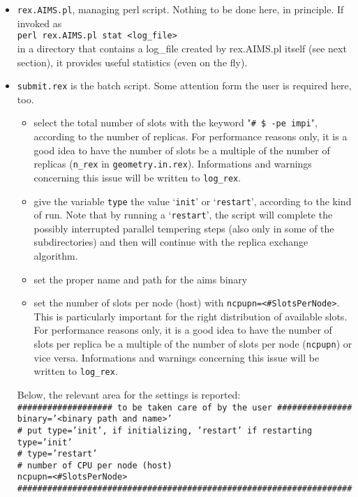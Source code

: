 \begin{itemize}
\item \texttt{rex.AIMS.pl}, managing perl script. Nothing to be done here, in principle. If invoked as \\
\texttt{perl rex.AIMS.pl stat <log\_file>}\\
in a directory that contains a log\_file created by rex.AIMS.pl itself (see next section), it provides useful statistics (even on the fly).


\item \texttt{submit.rex} is the batch script. Some attention form the user is required here, too.
\begin{itemize}
	\item select the total number of slots with the keyword "\texttt{\# \$ -pe impi}", according to the number of replicas. For performance reasons only, it is a good idea to have the number of slots be a multiple of the number of replicas (\texttt{n\_rex} in \texttt{geometry.in.rex}). Informations and warnings concerning this issue will be written to \texttt{log\_rex}.

\item give the variable \texttt{type} the value `\texttt{init}' or `\texttt{restart}', according to the kind of run. Note that by running a `\texttt{restart}', the script will complete the possibly interrupted parallel tempering steps (also only in some of the subdirectories) and then will continue with the replica exchange algorithm. 

\item set the proper name and path for the aims binary

\item set the number of slots per node (host) with \texttt{ncpupn=<\#SlotsPerNode>}. This is particularly important for the right distribution of available slots. For performance reasons only, it is a good idea to have the number of slots per replica be a multiple of the number of slots per node (\texttt{ncpupn}) or vice versa. Informations and warnings concerning this issue will be written to \texttt{log\_rex}.

\end{itemize}
Below, the relevant area for the settings is reported:\\
\texttt{\#\#\#\#\#\#\#\#\#\#\#\#\#\#\#\#\#\#\# to be taken care of by the user \#\#\#\#\#\#\#\#\#\#\#\#\#\#\# \\
binary='<binary path and name>' \\
\# put  type='init', if initializing, 'restart' if restarting \\
type='init' \\
\# type='restart' \\
\# number of CPU per node (host)\\
ncpupn=<\#SlotsPerNode>\\
\#\#\#\#\#\#\#\#\#\#\#\#\#\#\#\#\#\#\#\#\#\#\#\#\#\#\#\#\#\#\#\#\#\#\#\#\#\#\#\#\#\#\#\#\#\#\#\#\#\#\#\#\#\#\#\#\#\#\#\#\#\#\#\#\#\#\# \\
}


\end{itemize}
